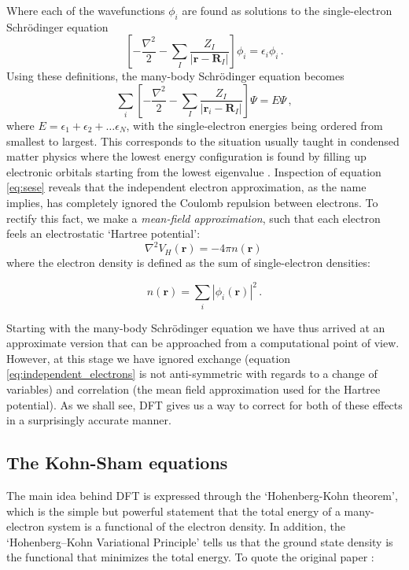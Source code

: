 %
Where each of the wavefunctions $\phi_i$ are found as solutions to the single-electron Schr\"odinger equation
%
\[ \left[ - \frac{\nabla^2}{2} - \sum_I \frac{Z_I}{|\bm{r} - \bm{R}_I|} \right] \phi_i = \epsilon_i \phi_i \, . \]
%
Using these definitions, the many-body Schr\"odinger equation becomes
%
\begin{equation}\label{eq:sese}
\sum_i \left[ - \frac{\nabla^2}{2} - \sum_I \frac{Z_I}{|\bm{r}_i - \bm{R}_I|} \right] \Psi = E \Psi \, , 
\end{equation}
%
where $E = \epsilon_1 + \epsilon_2 + \dots \epsilon_N$, with the single-electron energies being ordered from smallest to largest. This corresponds to the situation usually taught in condensed matter physics where the lowest energy configuration is found by filling up electronic orbitals starting from the lowest eigenvalue \cite{Kittel2005}. Inspection of equation \ref{eq:sese} reveals that the independent electron approximation, as the name implies, has completely ignored the Coulomb repulsion between electrons. To rectify this fact, we make a \emph{mean-field approximation}, such that each electron feels an electrostatic `Hartree potential':
%
\[ \nabla^2 V_H(\bm{r}) = - 4 \pi n(\bm{r}) \, \] 
%
where the electron density is defined as the sum of single-electron densities:

\begin{equation}\label{eq:electron_density}
n(\bm{r}) = \sum_i |\phi_i(\bm{r})|^2 \, .
\end{equation}

\noindent Starting with the many-body Schr\"odinger equation we have thus arrived at an approximate version that can be approached from a computational point of view. However, at this stage we have ignored exchange (equation \eqref{eq:independent_electrons} is not anti-symmetric with regards to a change of variables) and correlation (the mean field approximation used for the Hartree potential). As we shall see, DFT gives us a way to correct for both of these effects in a surprisingly accurate manner.

\subsection{The Kohn-Sham equations}
The main idea behind DFT is expressed through the `Hohenberg-Kohn theorem', which is the simple but powerful statement that the total energy of a many-electron system is a functional of the electron density. In addition, the `Hohenberg–Kohn Variational Principle' tells us that the ground state density is the functional that minimizes the total energy. To quote the original paper \cite{Hohenberg1964}:

